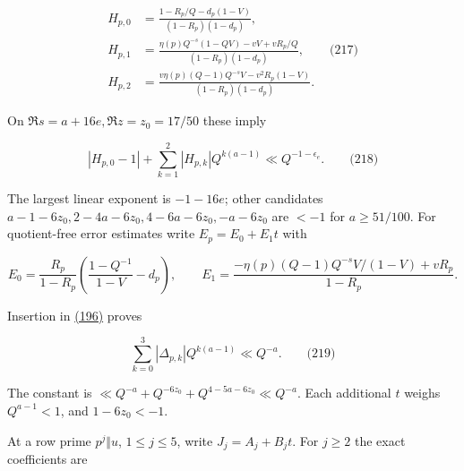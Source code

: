 \hypertarget{dr:Hcoeff}{}

\label{dr:Hcoeff}

\[
\begin{aligned}
 H_{p,0}&=\frac{1-R_p/Q-d_p(1-V)}{(1-R_p)(1-d_p)},\\
 H_{p,1}&=\frac{\eta(p)Q^{-s}(1-QV)-vV+vR_p/Q}
 {(1-R_p)(1-d_p)},\qquad\text{(217)}\\
 H_{p,2}&=\frac{v\eta(p)(Q-1)Q^{-s}V-v^2R_p(1-V)}
 {(1-R_p)(1-d_p)}.
\end{aligned}
\]

On \(\Re s=a+16e,\Re z=z_0=17/50\) these imply

\hypertarget{dr:Hcoeff-bound}{}

\label{dr:Hcoeff-bound}

\[
|H_{p,0}-1|+\sum_{k=1}^2|H_{p,k}|Q^{k(a-1)}
 \ll Q^{-1-\epsilon_e}.
 \qquad\text{(218)}
\]

The largest linear exponent is \(-1-16e\); other candidates \(a-1-6z_0,2-4a-6z_0,4-6a-6z_0,-a-6z_0\) are \(<-1\) for \(a\ge51/100\). For quotient-free error estimates write \(E_p=E_0+E_1t\) with

\[
E_0=\frac{R_p}{1-R_p}\left(\frac{1-Q^{-1}}{1-V}-d_p\right),\qquad
 E_1=\frac{-\eta(p)(Q-1)Q^{-s}V/(1-V)+vR_p}{1-R_p}.
\]

Insertion in \protect\hyperlink{dr:Delta}{(196)} proves

\hypertarget{dr:Delta-bound}{}

\label{dr:Delta-bound}

\[
\sum_{k=0}^3|\Delta_{p,k}|Q^{k(a-1)}\ll Q^{-a}.
 \qquad\text{(219)}
\]

The constant is \(\ll Q^{-a}+Q^{-6z_0}+Q^{4-5a-6z_0}\ll Q^{-a}\). Each additional \(t\) weighs \(Q^{a-1}<1\), and \(1-6z_0<-1\).

At a row prime \(p^j\Vert u\), \(1\le j\le5\), write \(J_j=A_j+B_jt\). For \(j\ge2\) the exact coefficients are

\hypertarget{dr:rowcoeff}{}

\label{dr:rowcoeff}

\par\noindent\resizebox{\linewidth}{!}{\begin{minipage}{\dimexpr\linewidth+6.42113pt\relax}\[
\begin{aligned}
 H_0&=\frac{1-R_p/Q+(1-V)A_j}{1-R_p},&
 H_1&=\frac{-\eta(p)(Q-1)Q^{-s}+(1-V)B_j}{1-R_p},\\
 G_0&=\frac{c_p\{R_p(1-Q^{-1})+(1-V)A_j\}}{1-R_p},&
 G_1&=\frac{-Q+R_p/Q+(1-V)(c_pB_j-A_j)}{1-R_p},
 \quad G_2=-H_1.\qquad\text{(220)}
\end{aligned}
\]\end{minipage}}\par

